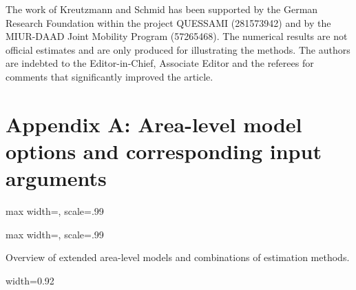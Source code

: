 The work of Kreutzmann and Schmid has been supported by the German
Research Foundation within the project QUESSAMI (281573942) and by the
MIUR-DAAD Joint Mobility Program (57265468). The numerical results are
not official estimates and are only produced for illustrating the
methods. The authors are indebted to the Editor-in-Chief, Associate
Editor and the referees for comments that significantly improved the
article.

\hypertarget{sec:AppendixA}{%
\section{Appendix A: Area-level model options and corresponding input arguments}\label{sec:AppendixA}}

{max width=, scale=.99}

{max width=, scale=.99}

Overview of extended area-level models and combinations of
estimation methods.

width=0.92


